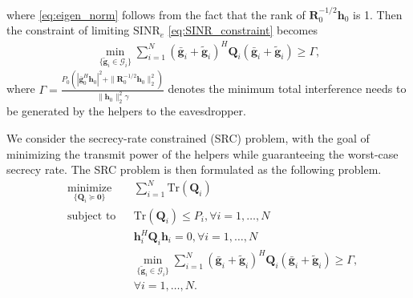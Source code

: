 \documentclass[journal]{IEEEtran}
\begin{document}
where \eqref{eq:eigen_norm} follows from the fact that the rank of $\mathbf{R}_0^{-1/2}\mathbf{h}_0$ is 1. Then the constraint of limiting $\mathrm{SINR}_e$ \eqref{eq:SINR_constraint}  becomes
\begin{eqnarray} \label{eq:sum_noise}
\min_{\{\tilde{\mathbf{g}}_i \in \mathcal{G}_i\}}\sum_{i=1}^{N}(\bar{\mathbf{g}}_i+\tilde{\mathbf{g}}_i)^H\mathbf{Q}_i(\bar{\mathbf{g}}_i+\tilde{\mathbf{g}}_i) \geq \Gamma  \label{eq:artificial noise constraint},
\end{eqnarray}
where $\Gamma =\frac{P_0\left(|\bar{\mathbf{g}}_0^H\mathbf{h}_0|^2 + \|\mathbf{R}_0^{-1/2}\mathbf{h}_0\|_2^2\right)}{\|\mathbf{h}_0\|_2^2\gamma}$ denotes the  minimum total  interference needs to be generated by the helpers to the eavesdropper. 

We consider the secrecy-rate constrained (SRC) problem, with the goal of minimizing the transmit power of the helpers while guaranteeing the worst-case secrecy rate. The SRC problem is then formulated as the following problem.
\begin{equation}
\begin{aligned} \label{eq:problem1}
& \underset{\{\mathbf{Q}_i \succeq \mathbf{0}\}}{\text{minimize}}
& & \sum_{i = 1}^{N}\mathrm{Tr}(\mathbf{Q}_i) \\
& \text{subject to}
& & \mathrm{Tr}(\mathbf{Q}_i) \leq P_i, \forall i = 1, \ldots, N\\
&&& \mathbf{h}_i^H \mathbf{Q}_i \mathbf{h}_i= 0, \forall i = 1,\ldots,N\\
&&& \min_{\{\tilde{\mathbf{g}}_i \in \mathcal{G}_i\}}\sum_{i=1}^{N}(\bar{\mathbf{g}}_i+\tilde{\mathbf{g}}_i)^H\mathbf{Q}_i(\bar{\mathbf{g}}_i+\tilde{\mathbf{g}}_i) \geq  \Gamma,\\
&&& \forall i = 1, \ldots, N.
\end{aligned}
\end{equation}
\end{document}
